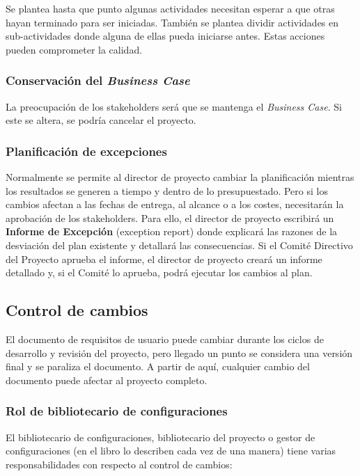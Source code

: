 \documentclass[12pt]{article}
\begin{document}
{Se plantea hasta que punto algunas actividades necesitan esperar a que otras hayan terminado para ser iniciadas. También se plantea dividir actividades en sub-actividades donde alguna de ellas pueda iniciarse antes. Estas acciones pueden comprometer la calidad.}

\subsubsection{Conservación del \textit{Business Case}}
\label{9.8.3}

{La preocupación de los stakeholders será que se mantenga el \textit{Business Case}. Si este se altera, se podría cancelar el proyecto.}

\subsubsection{Planificación de excepciones}
\label{9.8.4}

{Normalmente se permite al director de proyecto cambiar la planificación mientras los resultados se generen a tiempo y dentro de lo presupuestado. Pero si los cambios afectan a las fechas de entrega, al alcance o a los costes, necesitarán la aprobación de los stakeholders. Para ello, el director de proyecto escribirá un \textbf{Informe de Excepción} (exception report) donde explicará las razones de la desviación del plan existente y detallará las consecuencias. Si el Comité Directivo del Proyecto aprueba el informe, el director de proyecto creará un informe detallado y, si el Comité lo aprueba, podrá ejecutar los cambios al plan.}

\subsection{Control de cambios}
\label{9.9.0}

{El documento de requisitos de usuario puede cambiar durante los ciclos de desarrollo y revisión del proyecto, pero llegado un punto se considera una versión final y se paraliza el documento. A partir de aquí, cualquier cambio del documento puede afectar al proyecto completo.}

\subsubsection{Rol de bibliotecario de configuraciones}
\label{9.9.1}

{El bibliotecario de configuraciones, bibliotecario del proyecto o gestor de configuraciones (en el libro lo describen cada vez de una manera) tiene varias responsabilidades con respecto al control de cambios:}
\end{document}
